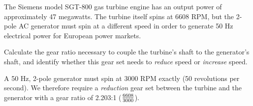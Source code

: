 

The Siemens model SGT-800 gas turbine engine has an output power of approximately 47 megawatts.  The turbine itself spins at 6608 RPM, but the 2-pole AC generator must spin at a different speed in order to generate 50 Hz electrical power for European power markets.

\vskip 10pt

Calculate the gear ratio necessary to couple the turbine's shaft to the generator's shaft, and identify whether this gear set needs to {\it reduce} speed or {\it increase} speed.








A 50 Hz, 2-pole generator must spin at 3000 RPM exactly (50 revolutions per second).  We therefore require a {\it reduction} gear set between the turbine and the generator with a gear ratio of 2.203:1 ($6608 \over 3000$).











